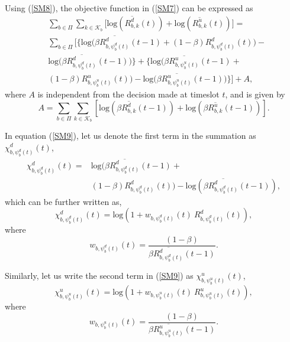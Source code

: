 \documentclass[journal]{IEEEtran}
\begin{document}
Using (\ref{SM8}), the objective function in (\ref{SM7}) can be expressed as
\begin{equation}\label{SM9}
\begin{split}
 & \textstyle \sum\limits_{b \in \Pi} \sum\limits_{k \in \mathcal{K}_b} \Big[ \mathrm{log}(\overline{R^d_{b,k}}(t)) + \mathrm{log}(\overline{R^u_{b,k}}(t)) \Big] = \\
 &\sum\limits_{b \in \Pi}  \bigg[ \Big\{ \mathrm{log}\big(\beta\overline{R^d_{b,\psi_b^d(t)}}(t-1) + (1-\beta)R^d_{b,\psi_b^d(t)}(t)\big) - \\
 & \textstyle \mathrm{log}\big(\beta\overline{R^d_{b,\psi_b^d(t)}}(t-1)\big) \Big\} + \Big\{ \mathrm{log}\big(\beta\overline{R^u_{b,\psi_b^u(t)}}(t-1) + \\
 &(1-\beta)R^u_{b,\psi_b^u(t)}(t)\big) - \mathrm{log}\big(\beta\overline{R^u_{b,\psi_b^u(t)}}(t-1)\big) \Big\} \bigg] + A,
 \end{split}
\end{equation}
where $A$ is independent from the decision made at timeslot $t$, and is given by
\begin{equation}\label{SM10}
A =\sum\limits_{b \in \Pi} \sum\limits_{k \in \mathcal{K}_b} \left[ \mathrm{log}(\beta\overline{R^d_{b,k}}(t-1)) + \mathrm{log}(\beta\overline{R^u_{b,k}}(t-1))\right].
\end{equation}

In equation (\ref{SM9}), let us denote the first term in the summation as $\chi^d_{b,\psi_b^d(t)}(t)$,
\begin{equation}\label{SM11}
\begin{split}
\chi^d_{b,\psi_b^d(t)}(t) = &\mathrm{log}(\beta\overline{R^d_{b,\psi_b^d(t)}}(t-1) + \\
&(1-\beta)R^d_{b,\psi_b^d(t)}(t)) - \mathrm{log}(\beta\overline{R^d_{b,\psi_b^d(t)}}(t-1)),
 \end{split}
\end{equation}
which can be further written as,
\begin{equation}\label{SM11_1}
\chi^d_{b,\psi_b^d(t)}(t) = \mathrm{log}\left(1 +  w_{b,\psi_b^d(t)}(t)~R^d_{b,\psi_b^d(t)}(t)\right),
\end{equation}
where
\begin{equation}\label{SM11_2}
w_{b,\psi_b^d(t)}(t) =  \frac{(1-\beta)}{\beta\overline{R^d_{b,\psi_b^d(t)}}(t-1)}.
\end{equation}

Similarly, let us write the second term in (\ref{SM9}) as $\chi^u_{b,\psi_b^u(t)}(t)$,
\begin{equation}\label{SM12}
\chi^u_{b,\psi_b^u(t)}(t) = \mathrm{log}\left(1 + w_{b,\psi_b^u(t)}(t)~R^u_{b,\psi_b^u(t)}(t)\right),
\end{equation}
where
\begin{equation}\label{SM12_1}
w_{b,\psi_b^u(t)}(t) =  \frac{(1-\beta)}{\beta\overline{R^u_{b,\psi_b^u(t)}}(t-1)}.
\end{equation}
\end{document}
